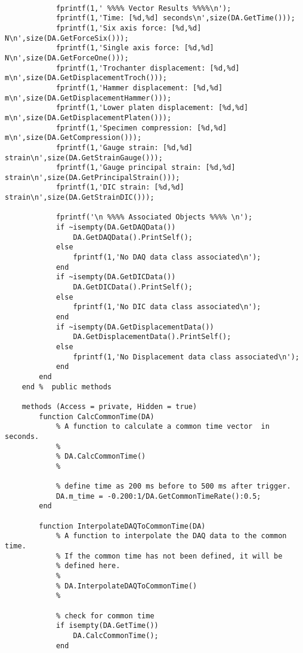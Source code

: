 \begin{lstlisting}
            
            fprintf(1,' %%%% Vector Results %%%%\n');
            fprintf(1,'Time: [%d,%d] seconds\n',size(DA.GetTime()));
            fprintf(1,'Six axis force: [%d,%d] N\n',size(DA.GetForceSix()));
            fprintf(1,'Single axis force: [%d,%d] N\n',size(DA.GetForceOne()));
            fprintf(1,'Trochanter displacement: [%d,%d] m\n',size(DA.GetDisplacementTroch()));
            fprintf(1,'Hammer displacement: [%d,%d] m\n',size(DA.GetDisplacementHammer()));
            fprintf(1,'Lower platen displacement: [%d,%d] m\n',size(DA.GetDisplacementPlaten()));
            fprintf(1,'Specimen compression: [%d,%d] m\n',size(DA.GetCompression()));
            fprintf(1,'Gauge strain: [%d,%d] strain\n',size(DA.GetStrainGauge()));
            fprintf(1,'Gauge principal strain: [%d,%d] strain\n',size(DA.GetPrincipalStrain()));
            fprintf(1,'DIC strain: [%d,%d] strain\n',size(DA.GetStrainDIC()));
            
            fprintf('\n %%%% Associated Objects %%%% \n');
            if ~isempty(DA.GetDAQData())
                DA.GetDAQData().PrintSelf();
            else
                fprintf(1,'No DAQ data class associated\n');
            end
            if ~isempty(DA.GetDICData())
                DA.GetDICData().PrintSelf();
            else
                fprintf(1,'No DIC data class associated\n');
            end
            if ~isempty(DA.GetDisplacementData())
                DA.GetDisplacementData().PrintSelf();
            else
                fprintf(1,'No Displacement data class associated\n');
            end
        end    
    end %  public methods
    
    methods (Access = private, Hidden = true)
        function CalcCommonTime(DA)
            % A function to calculate a common time vector  in seconds.
            %
            % DA.CalcCommonTime()
            %
            
            % define time as 200 ms before to 500 ms after trigger.
            DA.m_time = -0.200:1/DA.GetCommonTimeRate():0.5;
        end
        
        function InterpolateDAQToCommonTime(DA)
            % A function to interpolate the DAQ data to the common time.
            % If the common time has not been defined, it will be 
            % defined here.
            %
            % DA.InterpolateDAQToCommonTime()
            %
            
            % check for common time
            if isempty(DA.GetTime())
                DA.CalcCommonTime();
            end
            

\end{lstlisting}

